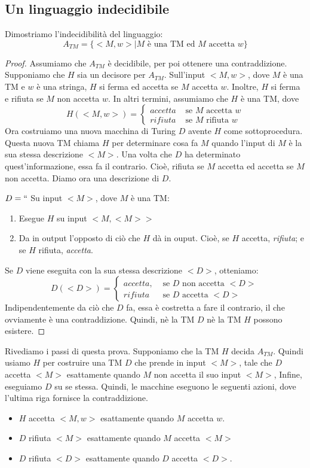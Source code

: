 \documentclass[12pt]{report}
\begin{document}
\subsection{Un linguaggio indecidibile}
Dimostriamo l'indecidibilità del linguaggio:
\[
A_{TM} = \{<M, w> \mid M \text{ è una TM ed } M \text{ accetta }w\}
\]
\begin{proof}
	Assumiamo che $A_{TM}$ è decidibile, per poi ottenere una contraddizione. Supponiamo che $H$ sia un decisore per $A_{TM}$. Sull'input $<M, w>$, dove $M$ è una TM e $w$ è una stringa, $H$ si ferma ed accetta se $M$ accetta $w$. Inoltre, $H$ si ferma e rifiuta se $M$ non accetta $w$. In altri termini, assumiamo che $H$ è una TM, dove
	\[
	H\left(<M, w>\right) = \begin{cases}
		accetta &\text{ se $M$ accetta $w$}\\
		rifiuta &\text{ se $M$ rifiuta $w$}
	\end{cases}
	\]
Ora costruiamo una nuova macchina di Turing $D$ avente $H$ come sottoprocedura. Questa nuova TM chiama $H$ per determinare cosa fa $M$ quando l'input di $M$ è la sua stessa descrizione $<M>$. Una volta che $D$ ha determinato quest'informazione, essa fa il contrario. Cioè, rifiuta se $M$ accetta ed accetta se $M$ non accetta. Diamo ora una descrizione di $D$.

$D = ``$ Su input $<M>$, dove $M$ è una TM:
\begin{enumerate}
	\item Esegue $H$ su input $<M, <M>>$
	\item Da in output l'opposto di ciò che $H$ dà in ouput. Cioè, se $H$ accetta, \textit{rifiuta}; e se $H$ rifiuta, \textit{accetta}.
\end{enumerate}
Se $D$ viene eseguita con la sua stessa descrizione $<D>$, otteniamo:
\[
D\left(<D>\right) = \begin{cases}
	accetta, &\text{ se $D$ non accetta $<D>$}\\
	rifiuta &\text{ se $D$ accetta $<D>$}
\end{cases}
\]
Indipendentemente da ciò che $D$ fa, essa è costretta a fare il contrario, il che ovviamente è una contraddizione. Quindi, nè la TM $D$ nè la TM $H$ possono esistere.
\end{proof}
Rivediamo i passi di questa prova. Supponiamo che la TM $H$ decida $A_{TM}$. Quindi usiamo $H$ per costruire una TM $D$ che prende in input $<M>$, tale che $D$ accetta $<M>$ esattamente quando $M$ non accetta il suo input $<M>$, Infine, eseguiamo $D$ su se stessa. Quindi, le macchine eseguono le seguenti azioni, dove l'ultima riga fornisce la contraddizione.
\begin{itemize}
	\item $H$ accetta $<M, w>$ esattamente quando $M$ accetta $w$.
	\item $D$ rifiuta $<M>$ esattamente quando $M$ accetta $<M>$
	\item $D$ rifiuta $<D>$ esattamente quando $D$ accetta $<D>$.
\end{itemize}
\end{document}
